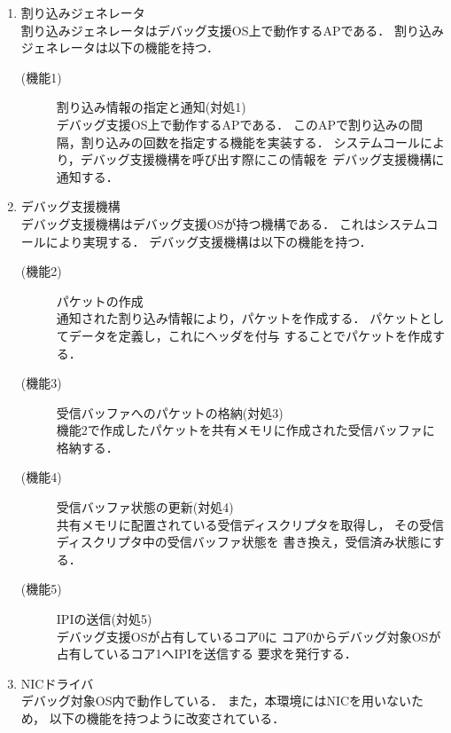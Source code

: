 \documentclass[submit,techreq,noauthor,dvipdfmx]{ipsj}
\begin{document}
\begin{enumerate}
    \item 割り込みジェネレータ\\
        割り込みジェネレータはデバッグ支援OS上で動作するAPである．
        割り込みジェネレータは以下の機能を持つ．
        \begin{description}
            \item[(機能1)] 割り込み情報の指定と通知(対処1)\\
                デバッグ支援OS上で動作するAPである．
                このAPで割り込みの間隔，割り込みの回数を指定する機能を実装する．
                システムコールにより，デバッグ支援機構を呼び出す際にこの情報を
                デバッグ支援機構に通知する．
        \end{description}
    \item デバッグ支援機構\\
        デバッグ支援機構はデバッグ支援OSが持つ機構である．
        これはシステムコールにより実現する．
        デバッグ支援機構は以下の機能を持つ．
        \begin{description}
            \item[(機能2)] パケットの作成\\
                通知された割り込み情報により，パケットを作成する．
                パケットとしてデータを定義し，これにヘッダを付与
                することでパケットを作成する．
            \item[(機能3)] 受信バッファへのパケットの格納(対処3)\\
                機能2で作成したパケットを共有メモリに作成された受信バッファに格納する．
            \item[(機能4)] 受信バッファ状態の更新(対処4)\\
                共有メモリに配置されている受信ディスクリプタを取得し，
                その受信ディスクリプタ中の受信バッファ状態を
                書き換え，受信済み状態にする．
            \item[(機能5)] IPIの送信(対処5)\\
                デバッグ支援OSが占有しているコア0に
                コア0からデバッグ対象OSが占有しているコア1へIPIを送信する
                要求を発行する．
        \end{description}
    \item NICドライバ\\
        デバッグ対象OS内で動作している．
        また，本環境にはNICを用いないため，
        以下の機能を持つように改変されている．
        \begin{description}

\end{description}
\end{enumerate}
\end{document}
